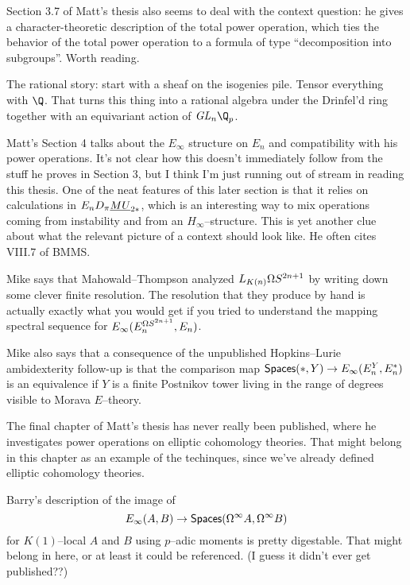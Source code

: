 Section 3.7 of Matt's thesis also seems to deal with the context question: he gives a character-theoretic description of the total power operation, which ties the behavior of the total power operation to a formula of type ``decomposition into subgroups''.  Worth reading.

The rational story: start with a sheaf on the isogenies pile.  Tensor everything with $\Q$.  That turns this thing into a rational algebra under the Drinfel'd ring together with an equivariant action of $\GL_n \Q_p$.

Matt's Section 4 talks about the $E_\infty$ structure on $E_n$ and compatibility with his power operations.  It's not clear how this doesn't immediately follow from the stuff he proves in Section 3, but I think I'm just running out of stream in reading this thesis.  One of the neat features of this later section is that it relies on calculations in $E_n D_\pi \underline{\smash{MU}}_{2*}$, which is an interesting way to mix operations coming from instability and from an $H_\infty$--structure.  This is yet another clue about what the relevant picture of a context should look like.  He often cites VIII.7 of BMMS.

Mike says that Mahowald--Thompson analyzed $L_{K(n)} \Omega S^{2n+1}$ by writing down some clever finite resolution.  The resolution that they produce by hand is actually exactly what you would get if you tried to understand the mapping spectral sequence for $E_\infty(E_n^{\Omega S^{2n+1}}, E_n)$.

Mike also says that a consequence of the unpublished Hopkins--Lurie ambidexterity follow-up is that the comparison map $\mathsf{Spaces}(*, Y) \to E_\infty(E_n^Y, E_n^*)$ is an equivalence if $Y$ is a finite Postnikov tower living in the range of degrees visible to Morava $E$--theory.

The final chapter of Matt's thesis has never really been published, where he investigates power operations on elliptic cohomology theories.  That might belong in this chapter as an example of the techinques, since we've already defined elliptic cohomology theories.

Barry's description of the image of \[E_\infty(A, B) \to \mathsf{Spaces}(\Omega^\infty A, \Omega^\infty B)\] for $K(1)$--local $A$ and $B$ using $p$--adic moments is pretty digestable.  That might belong in here, or at least it could be referenced.  (I guess it didn't ever get published??)
